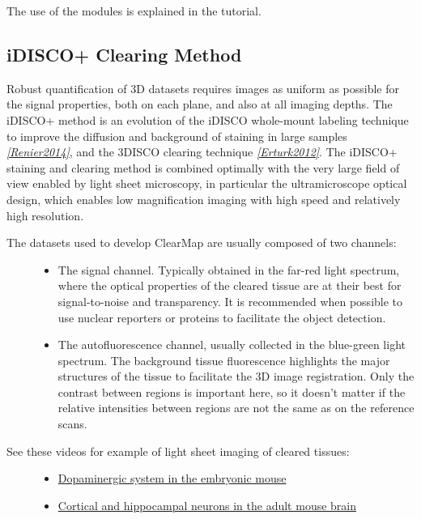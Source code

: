 \documentclass[letterpaper,10pt,english]{sphinxmanual}
\begin{document}
The use of the modules is explained in the tutorial.


\subsection{iDISCO+ Clearing Method}
\label{introduction:idisco-clearing-method}
Robust quantification of 3D datasets requires images as uniform as possible for the signal properties, both on each plane, and also at all imaging depths. The iDISCO+ method is an evolution of the iDISCO whole-mount labeling technique to improve the diffusion and background of staining in large samples \label{introduction:id6}{\hyperref[introduction:renier2014]{\emph{{[}Renier2014{]}}}}, and the 3DISCO clearing technique \label{introduction:id7}{\hyperref[introduction:erturk2012]{\emph{{[}Erturk2012{]}}}}. The iDISCO+ staining and clearing method is combined optimally with the very large field of view enabled by light sheet microscopy, in particular the ultramicroscope optical design, which enables low magnification imaging with high speed and relatively high resolution.
\begin{description}
\item[{The datasets used to develop ClearMap are usually composed of two channels:}] \leavevmode\begin{itemize}
\item {} 
The signal channel. Typically obtained in the far-red light spectrum, where the optical properties of the cleared tissue are at their best for signal-to-noise and transparency. It is recommended when possible to use nuclear reporters or proteins to facilitate the object detection.

\item {} 
The autofluorescence channel, usually collected in the blue-green light spectrum. The background tissue fluorescence highlights the major structures of the tissue to facilitate the 3D image registration. Only the contrast between regions is important here, so it doesn’t matter if the relative intensities between regions are not the same as on the reference scans.

\end{itemize}

\item[{See these videos for example of light sheet imaging of cleared tissues:}] \leavevmode\begin{itemize}
\item {} 
\href{https://www.youtube.com/watch?v=-ctRUMQjizgvbLtLYkW6hI}{Dopaminergic system in the embryonic mouse}

\item {} 
\href{https://www.youtube.com/watch?v=vbLtLYkW6hI}{Cortical and hippocampal neurons in the adult mouse brain}

\end{itemize}

\end{description}
\end{document}
